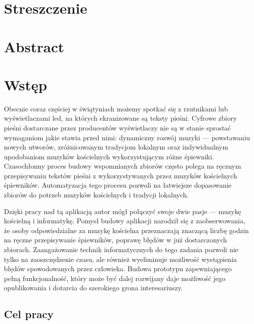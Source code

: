 \documentclass[a4paper,12pt]{article}
\begin{document}
	\setcounter{page}{2}
    \tableofcontents
	\newpage 
	
    \section*{Streszczenie}
	\section*{Abstract}
	\newpage 

	\section{Wstęp}
		\paragraph{\indent} Obecnie coraz częściej w świątyniach możemy spotkać się z rzutnikami lub wyświetlaczami led, 
			na których ekranizowane są teksty pieśni. Cyfrowe zbiory pieśni dostarczane przez producentów wyświetlaczy 
			nie są w stanie sprostać wymaganiom jakie stawia przed nimi: dynamiczny rozwój muzyki --- powstawaniu nowych utworów, 
			zróżnicowanym tradycjom lokalnym oraz indywidualnym upodobaniom muzyków kościelnych wykorzystującym różne śpiewniki. 
			Czasochłonny proces budowy wspomnianych zbiorów często polega na ręcznym przepisywaniu tekstów pieśni 
			z wykorzystywanych przez muzyków kościelnych śpiewników. Automatyzacja tego procesu pozwoli na łatwiejsze dopasowanie zbiorów 
			do potrzeb muzyków kościelnych i tradycji lokalnych. 
		\par Dzięki pracy nad tą aplikacją autor mógł połączyć swoje dwie pasje --- muzykę kościelną i informatykę. 
			Pomysł budowy aplikacji narodził się z zaobserwowania, że osoby odpowiedzialne za muzykę kościelna przeznaczają znaczącą liczbę godzin 
			na ręczne przepisywanie śpiewników, poprawę błędów w już dostarczonych zbiorach. Zaangażowanie technik informatycznych do tego zadania 
			pozwoli nie tylko na zaoszczędzenie czasu, ale również wyeliminuje możliwość wystąpienia błędów spowodowanych przez człowieka. 
			Budowa prototypu zapewniającego pełną funkcjonalność, który może być dalej rozwijany daje możliwość jego opublikowania 
			i dotarcia do szerokiego grona interesariuszy.  
		\subsection{Cel pracy}
\end{document}
